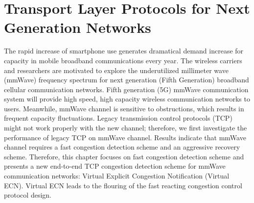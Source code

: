 \chapter{Transport Layer Protocols for Next Generation Networks}\label{ch:5} 


\par The rapid increase of smartphone use generates dramatical demand increase for capacity in mobile broadband communications every year. The wireless carriers and researchers are motivated to explore the underutilized millimeter wave (mmWave) frequency spectrum for next generation (Fifth Generation) broadband cellular communication networks. Fifth generation (5G) mmWave communication system will provide high speed, high capacity wireless communication networks to users. Meanwhile, mmWave channel is sensitive to obstructions, which results in frequent capacity fluctuations. Legacy transmission control protocols (TCP) might not work properly with the new channel; therefore, we first investigate the performance of legacy TCP on mmWave channel. Results indicate that mmWave channel requires a fast congestion detection scheme and an aggressive recovery scheme. Therefore, this chapter focuses on fast congestion detection scheme and presents a new end-to-end TCP congestion detection scheme for mmWave communication networks: Virtual Explicit Congestion Notification (Virtual ECN). Virtual ECN leads to the flouring of the fast reacting congestion control protocol design.
